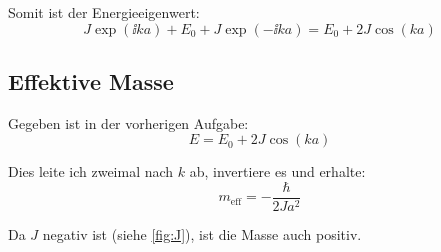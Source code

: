 Somit ist der Energieeigenwert:
\[
	J \exp(\ii ka) + E_0 + J \exp(-\ii ka)
	=
	E_0 + 2 J \cos(ka)
\]

\subsection{Effektive Masse}

Gegeben ist in der vorherigen Aufgabe:
\[
	E = E_0 + 2 J \cos(ka)
\]

Dies leite ich zweimal nach $k$ ab, invertiere es und erhalte:
\[
	m_\text{eff} = - \frac{\hbar}{2Ja^2}
\]

Da $J$ negativ ist (siehe \cref{fig:J}), ist die Masse auch positiv.


\IfFileExists{\bibliographyfile}{
	
}{}



